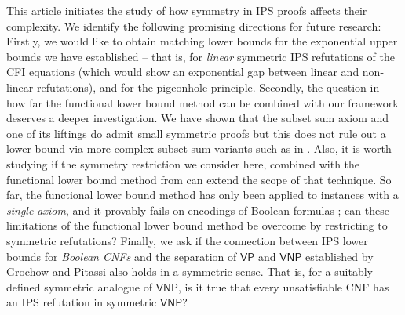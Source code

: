 \documentclass[10pt,a4paper]{article}
\newcommand{\VNP}{\mathsf{VNP}}
\newcommand{\VP}{\mathsf{VP}}
\begin{document}
This article initiates the study of how symmetry in IPS proofs affects their complexity. We identify the following promising directions for future research:
Firstly, we would like to obtain matching lower bounds for the exponential upper bounds we have established -- that is, for \emph{linear} symmetric IPS refutations of the CFI equations (which would show an exponential gap between linear and non-linear refutations), and for the pigeonhole principle. 
Secondly, the question in how far the functional lower bound method \cite{lowerbounds_IPS, govindasamy2022simple, hakoniemi2024functional} can be combined with our framework deserves a deeper investigation. We have shown that the subset sum axiom and one of its liftings do admit small symmetric proofs but this does not rule out a lower bound via more complex subset sum variants such as in \cite{govindasamy2022simple, hakoniemi2024functional}. 
Also, it is worth studying if the symmetry restriction we consider here, combined with the functional lower bound method from \cite{govindasamy2022simple, hakoniemi2024functional} can extend the scope of that technique. So far, the functional lower bound method has only been applied to instances with a \emph{single axiom}, and it provably fails on encodings of Boolean formulas \cite{hakoniemi2024functional}; can these limitations of the functional lower bound method be overcome by restricting to symmetric refutations?
Finally, we ask if the connection between IPS lower bounds for \emph{Boolean CNFs} and the separation of $\VP$ and $\VNP$ established by Grochow and Pitassi \cite{IPS} also holds in a symmetric sense. 
That is, for a suitably defined symmetric analogue of $\VNP$, is it true that every unsatisfiable CNF has an IPS refutation in symmetric $\VNP$?

 










\newpage
\appendix
\end{document}
